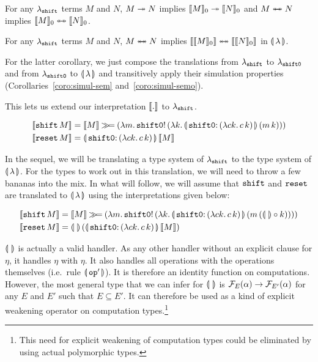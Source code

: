 \begin{corollary}
  \label{coro:simul-semo}
  For any $\lambda_{\mathtt{shift}}$ terms $M$ and $N$, $M \twoheadrightarrow N$ implies $\llbracket M \rrbracket_0
  \twoheadrightarrow \llbracket N \rrbracket_0$ and $M \twoheadleftarrow \mathrel{\mkern-15mu} \twoheadrightarrow N$ implies $\llbracket M \rrbracket_0 \twoheadleftarrow \mathrel{\mkern-15mu} \twoheadrightarrow \llbracket N \rrbracket_0$.
\end{corollary}

\begin{corollary}
  For any $\lambda_{\mathtt{shift}}$ terms $M$ and $N$, $M \twoheadleftarrow \mathrel{\mkern-15mu} \twoheadrightarrow N$ implies
  $\llbracket \llbracket M \rrbracket_0 \rrbracket \twoheadleftarrow \mathrel{\mkern-15mu} \twoheadrightarrow \llbracket \llbracket N \rrbracket_0 \rrbracket$ in $\llparenthesis \, \lambda \, \rrparenthesis$.
\end{corollary}

For the latter corollary, we just compose the translations from
$\lambda_{\mathtt{shift}}$ to $\lambda_{\mathtt{shift0}}$ and from $\lambda_{\mathtt{shift0}}$ to
$\llparenthesis \, \lambda \, \rrparenthesis$ and transitively apply their simulation properties
(Corollaries~\ref{coro:simul-sem} and~\ref{coro:simul-semo}).

This lets us extend our interpretation $\llbracket . \rrbracket$ to $\lambda_{\mathtt{shift}}$.

\begin{align*}
  \sem{\ap{\shift}{M}} &= \sem{M} \hsbind (\lam{m}{\ap{\op{shift0}!}{(\lam{k}{\ap{\resetobanana}{(\ap{m}{k})}})}}) \\
  \sem{\ap{\reset}{M}} &= \ap{\resetobanana}{\sem{M}}
\end{align*}

In the sequel, we will be translating a type system of $\lambda_{\mathtt{shift}}$ to
the type system of $\llparenthesis \, \lambda \, \rrparenthesis$. For the types to work out in this
translation, we will need to throw a few bananas into the mix. In what will
follow, we will assume that $\mathtt{shift}$ and $\mathtt{reset}$ are translated to
$\llparenthesis \, \lambda \, \rrparenthesis$ using the interpretations given below:

\begin{align*}
  \sem{\ap{\shift}{M}} &= \sem{M} \hsbind (\lam{m}{\ap{\op{\shift0}!}{(\lam{k}{\ap{\resetobanana}{(\ap{m}{(\banana{} \compop k)})}})}}) \\
  \sem{\ap{\reset}{M}} &= \ap{\banana{}}{(\ap{\resetobanana}{\sem{M}})}
\end{align*}

$\llparenthesis \,  \, \rrparenthesis$ is actually a valid handler. As any other handler without an
explicit clause for $\eta$, it handles $\eta$ with $\eta$. It also handles
all operations with the operations themselves (i.e.\ rule
$\llparenthesis \, \mathtt{op}' \, \rrparenthesis$). It is therefore an identity function on
computations. However, the most general type that we can infer for
$\llparenthesis \,  \, \rrparenthesis$ is $\mathcal{F}_E(\alpha) \to \mathcal{F}_{E'}(\alpha)$ for any $E$ and $E'$
such that $E \subseteq E'$. It can therefore be used as a kind of explicit
weakening operator on computation types.\footnote{This need for explicit
  weakening of computation types could be eliminated by using actual
  polymorphic types.}


